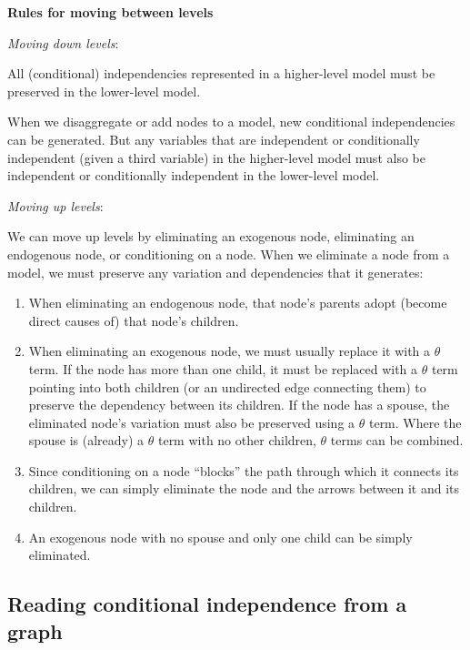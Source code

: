 \documentclass[
  12pt,
]{book}
\providecommand{\tightlist}{%
  \setlength{\itemsep}{0pt}\setlength{\parskip}{0pt}}
\newenvironment{headerbox}{
  \definecolor{shadecolor}{rgb}{0.8, 0.8, 0.8}  %
  \color{black}
  \begin{shaded}}{\end{shaded}}
\begin{document}
\begin{headerbox}

\begin{center}
\textbf{Rules for moving between levels}

\end{center}

\emph{Moving down levels}:

All (conditional) independencies represented in a higher-level model must be preserved in the lower-level model.

When we disaggregate or add nodes to a model, new conditional independencies can be generated. But any variables that are independent or conditionally independent (given a third variable) in the higher-level model must also be independent or conditionally independent in the lower-level model.

\emph{Moving up levels}:

We can move up levels by eliminating an exogenous node, eliminating an endogenous node, or conditioning on a node. When we eliminate a node from a model, we must preserve any variation and dependencies that it generates:

\begin{enumerate}
\def\labelenumi{\arabic{enumi}.}
\tightlist
\item
  When eliminating an endogenous node, that node's parents adopt (become direct causes of) that node's children.
\item
  When eliminating an exogenous node, we must usually replace it with a \(\theta\) term. If the node has more than one child, it must be replaced with a \(\theta\) term pointing into both children (or an undirected edge connecting them) to preserve the dependency between its children. If the node has a spouse, the eliminated node's variation must also be preserved using a \(\theta\) term. Where the spouse is (already) a \(\theta\) term with no other children, \(\theta\) terms can be combined.\\
\item
  Since conditioning on a node ``blocks'' the path through which it connects its children, we can simply eliminate the node and the arrows between it and its children.
\item
  An exogenous node with no spouse and only one child can be simply eliminated.
\end{enumerate}

\end{headerbox}

\hypertarget{reading-conditional-independence-from-a-graph}{%
\subsection{Reading conditional independence from a graph}\label{reading-conditional-independence-from-a-graph}}
\end{document}
